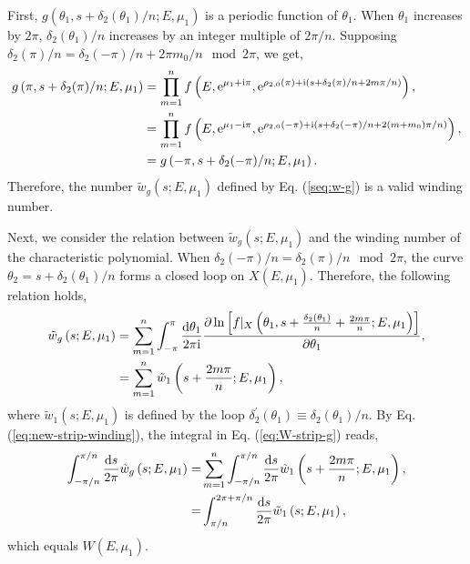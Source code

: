 First, $g(\theta_{1},s+\delta_{2}(\theta_{1})/n;E,\mu_{1})$ is a
periodic function of $\theta_{1}$. When $\theta_{1}$ increases by
$2\pi$, $\delta_{2}(\theta_{1})/n$ increases by an integer multiple
of $2\pi/n$. Supposing $\delta_{2}(\pi)/n=\delta_{2}(-\pi)/n+2\pi m_{0}/n\mod{2\pi}$,
we get, 
\begin{align}
g\left(\pi,s+\delta_{2}(\pi)/n;E,\mu_{1}\right) & =\prod_{m=1}^{n}f\left(E,\mathrm{e}^{\mu_{1}+\mathrm{i}\pi},\mathrm{e}^{\rho_{2,0}(\pi)+\mathrm{i}\left(s+\delta_{2}(\pi)/n+2m\pi/n\right)}\right),\nonumber \\
 & =\prod_{m=1}^{n}f\left(E,\mathrm{e}^{\mu_{1}-\mathrm{i}\pi},\mathrm{e}^{\rho_{2,0}(-\pi)+\mathrm{i}\left(s+\delta_{2}(-\pi)/n+2(m+m_{0})\pi/n\right)}\right),\nonumber \\
 & =g\left(-\pi,s+\delta_{2}(-\pi)/n;E,\mu_{1}\right).
\end{align}
Therefore, the number $\tilde{w}_{g}(s;E,\mu_{1})$ defined by Eq.
(\ref{seq:w-g}) is a valid winding number.

Next, we consider the relation between $\tilde{w}_{g}(s;E,\mu_{1})$
and the winding number of the characteristic polynomial. When $\delta_{2}(-\pi)/n=\delta_{2}(\pi)/n\mod{2\pi}$,
the curve $\theta_{2}=s+\delta_{2}(\theta_{1})/n$ forms a closed
loop on $X(E,\mu_{1})$. Therefore, the following relation holds,
\begin{align}
\tilde{w}_{g}\left(s;E,\mu_{1}\right) & =\sum_{m=1}^{n}\int_{-\pi}^{\pi}\frac{\mathrm{d}\theta_{1}}{2\pi\mathrm{i}}\frac{\partial\ln\left[f|_{X}\left(\theta_{1},s+\frac{\delta_{2}(\theta_{1})}{n}+\frac{2m\pi}{n};E,\mu_{1}\right)\right]}{\partial\theta_{1}},\nonumber \\
 & =\sum_{m=1}^{n}\tilde{w}_{1}\left(s+\frac{2m\pi}{n};E,\mu_{1}\right),\label{seq:relation-winding-numbers}
\end{align}
where $\tilde{w}_{1}(s;E,\mu_{1})$ is defined by the loop $\delta_{2}^{\prime}(\theta_{1})\equiv\delta_{2}(\theta_{1})/n$.
By Eq. (\ref{eq:new-strip-winding}), the integral in Eq. (\ref{eq:W-strip-g})
reads, 
\begin{align}
\int_{-\pi/n}^{\pi/n}\frac{\mathrm{d} s}{2\pi}\tilde{w}_{g}\left(s;E,\mu_{1}\right)= & \sum_{m=1}^{n}\int_{-\pi/n}^{\pi/n}\frac{\mathrm{d} s}{2\pi}\tilde{w}_{1}\left(s+\frac{2m\pi}{n};E,\mu_{1}\right),\nonumber \\
= & \int_{\pi/n}^{2\pi+\pi/n}\frac{\mathrm{d} s}{2\pi}\tilde{w}_{1}\left(s;E,\mu_{1}\right),
\end{align}
which equals $W(E,\mu_{1})$.

